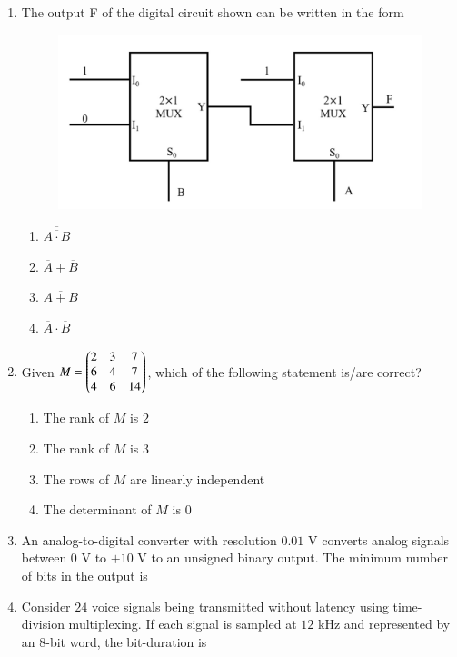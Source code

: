 \documentclass[journal,12pt,onecolumn]{IEEEtran}
\theoremstyle{remark}
\begin{document}
\begin{enumerate}
\item The output F of the digital circuit shown can be written in the form \underline{\hspace{2cm}}

\hfill{}
\begin{figure}[H]
\includegraphics[width = 0.7\columnwidth]{q23}
\caption*{}
\label{fig:q23}
\end{figure}
\begin{enumerate}
\item $\overline{\overline{A \cdot B}}$
\item $\overline{A} + \overline{B}$
\item $\overline{A+B}$
\item $\overline{A} \cdot \overline{B}$
\end{enumerate}

\item Given $M = \begin{pmatrix} 2 & 3 & 7 \\ 6 & 4 & 7 \\ 4 & 6 & 14 \end{pmatrix}$, which of the following statement is/are correct?

\hfill{}
\begin{enumerate}
\item The rank of $M$ is $2$
\item The rank of $M$ is $3$
\item The rows of $M$ are linearly independent
\item The determinant of $M$ is $0$
\end{enumerate}

\item An analog-to-digital converter with resolution $0.01$ V converts analog signals between $0$ V to $+10$ V to an unsigned binary output. The minimum number of bits  in the output is \underline{\hspace{2cm}}

\hfill{}

\item Consider $24$ voice signals being transmitted without latency using time-division multiplexing. If each signal is sampled at $12$ kHz and represented by an $8$-bit word, the bit-duration  is \underline{\hspace{2cm}} 


\end{enumerate}
\end{document}
